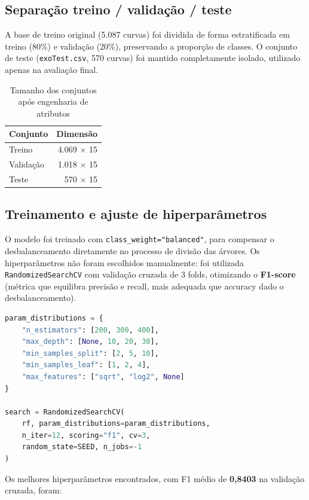 \documentclass[12pt,a4paper]{article}
\begin{document}
\subsection{Separação treino / validação / teste}

A base de treino original (5.087 curvas) foi dividida de forma estratificada em treino (80\%) e validação (20\%), preservando a proporção de classes. O conjunto de teste (\texttt{exoTest.csv}, 570 curvas) foi mantido completamente isolado, utilizado apenas na avaliação final.

\begin{table}[H]
\centering
\caption{Tamanho dos conjuntos após engenharia de atributos}
\begin{tabular}{lr}
\toprule
\textbf{Conjunto} & \textbf{Dimensão} \\
\midrule
Treino & 4.069 $\times$ 15 \\
Validação & 1.018 $\times$ 15 \\
Teste & 570 $\times$ 15 \\
\bottomrule
\end{tabular}
\end{table}

\subsection{Treinamento e ajuste de hiperparâmetros}

O modelo foi treinado com \texttt{class\_weight="balanced"}, para compensar o desbalanceamento diretamente no processo de divisão das árvores. Os hiperparâmetros não foram escolhidos manualmente: foi utilizada \texttt{RandomizedSearchCV} com validação cruzada de 3 folds, otimizando o \textbf{F1-score} (métrica que equilibra precisão e recall, mais adequada que accuracy dado o desbalanceamento).

\begin{lstlisting}[language=Python, caption={Configuração da busca de hiperparâmetros}]
param_distributions = {
    "n_estimators": [200, 300, 400],
    "max_depth": [None, 10, 20, 30],
    "min_samples_split": [2, 5, 10],
    "min_samples_leaf": [1, 2, 4],
    "max_features": ["sqrt", "log2", None]
}

search = RandomizedSearchCV(
    rf, param_distributions=param_distributions,
    n_iter=12, scoring="f1", cv=3,
    random_state=SEED, n_jobs=-1
)
\end{lstlisting}

Os melhores hiperparâmetros encontrados, com F1 médio de \textbf{0,8403} na validação cruzada, foram:
\end{document}
